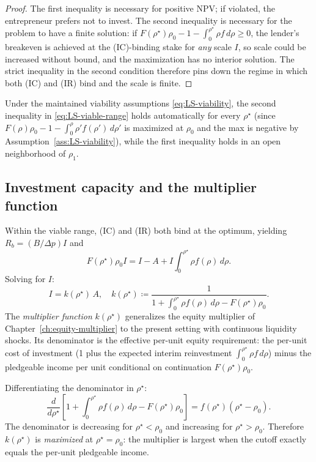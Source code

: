 \documentclass[11pt,a4paper,oneside]{book}
\def\geq{\geqslant}
\theoremstyle{plain}
\theoremstyle{definition}
\theoremstyle{remark}
\numberwithin{equation}{chapter}
\begin{document}
\begin{proof}
The first inequality is necessary for positive NPV; if violated, the entrepreneur prefers not to invest.
The second inequality is necessary for the problem to have a finite solution: if $F(\rho^\star)\rho_0 - 1 - \int_0^{\rho^\star}\rho f \, d\rho \geq 0$, the lender's breakeven is achieved at the (IC)-binding stake for \emph{any} scale $I$, so scale could be increased without bound, and the maximization has no interior solution.
The strict inequality in the second condition therefore pins down the regime in which both (IC) and (IR) bind and the scale is finite.
\end{proof}

Under the maintained viability assumptions \eqref{eq:LS-viability}, the second inequality in \eqref{eq:LS-viable-range} holds automatically for every $\rho^\star$ (since $F(\rho)\rho_0 - 1 - \int_0^\rho \rho'f(\rho') \, d\rho'$ is maximized at $\rho_0$ and the max is negative by Assumption~\ref{ass:LS-viability}), while the first inequality holds in an open neighborhood of $\rho_1$.

\subsection{Investment capacity and the multiplier function}

Within the viable range, (IC) and (IR) both bind at the optimum, yielding $R_b = (B/\Delta p) I$ and
\begin{equation*}
  F(\rho^\star) \rho_0 I = I - A + I \int_0^{\rho^\star} \rho f(\rho) \, d\rho.
\end{equation*}
Solving for $I$:
\begin{equation}\label{eq:LS-I-multiplier}
  I = k(\rho^\star) \, A,
  \quad
  k(\rho^\star) \coloneqq \frac{1}{1 + \int_0^{\rho^\star} \rho f(\rho) \, d\rho - F(\rho^\star) \rho_0}.
\end{equation}
The \emph{multiplier function} $k(\rho^\star)$ generalizes the equity multiplier of Chapter~\ref{ch:equity-multiplier} to the present setting with continuous liquidity shocks.
Its denominator is the effective per-unit equity requirement: the per-unit cost of investment (1 plus the expected interim reinvestment $\int_0^{\rho^\star}\rho f \, d\rho$) minus the pledgeable income per unit conditional on continuation $F(\rho^\star)\rho_0$.

Differentiating the denominator in $\rho^\star$:
\begin{equation*}
  \frac{d}{d\rho^\star} \left[ 1 + \int_0^{\rho^\star} \rho f(\rho) \, d\rho - F(\rho^\star) \rho_0 \right] = f(\rho^\star)(\rho^\star - \rho_0).
\end{equation*}
The denominator is decreasing for $\rho^\star < \rho_0$ and increasing for $\rho^\star > \rho_0$.
Therefore $k(\rho^\star)$ is \emph{maximized} at $\rho^\star = \rho_0$: the multiplier is largest when the cutoff exactly equals the per-unit pledgeable income.
\end{document}
